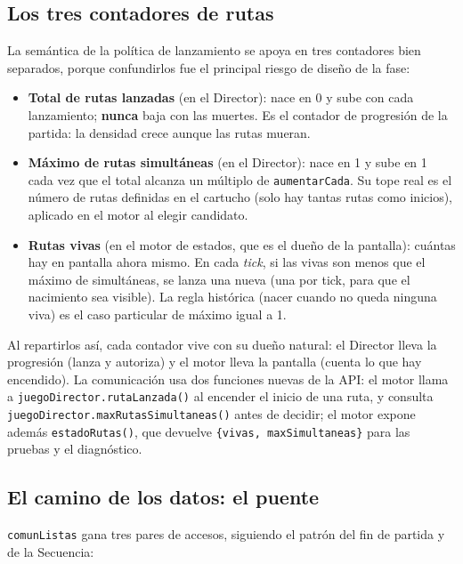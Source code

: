 \subsection{Los tres contadores de rutas}

La semántica de la política de lanzamiento se apoya en tres
contadores bien separados, porque confundirlos fue el principal
riesgo de diseño de la fase:

\begin{itemize}
	\item \textbf{Total de rutas lanzadas} (en el Director): nace en 0 y
	sube con cada lanzamiento; \textbf{nunca} baja con las muertes. Es el
	contador de progresión de la partida: la densidad crece aunque las
	rutas mueran.
	\item \textbf{Máximo de rutas simultáneas} (en el Director): nace en
	1 y sube en 1 cada vez que el total alcanza un múltiplo de
	\texttt{aumentarCada}. Su tope real es el número de rutas definidas
	en el cartucho (solo hay tantas rutas como inicios), aplicado en el
	motor al elegir candidato.
	\item \textbf{Rutas vivas} (en el motor de estados, que es el dueño
	de la pantalla): cuántas hay en pantalla ahora mismo. En cada
	\textit{tick}, si las vivas son menos que el máximo de simultáneas,
	se lanza una nueva (una por tick, para que el nacimiento sea
	visible). La regla histórica (nacer cuando no queda ninguna viva) es
	el caso particular de máximo igual a 1.
\end{itemize}

Al repartirlos así, cada contador vive con su dueño natural: el
Director lleva la progresión (lanza y autoriza) y el motor lleva la
pantalla (cuenta lo que hay encendido). La comunicación usa dos
funciones nuevas de la API: el motor llama a
\texttt{juegoDirector.rutaLanzada()} al encender el inicio de una
ruta, y consulta \texttt{juegoDirector.maxRutasSimultaneas()} antes
de decidir; el motor expone además
\texttt{estadoRutas()}, que devuelve \texttt{\{vivas,
	maxSimultaneas\}} para las pruebas y el diagnóstico.

\subsection{El camino de los datos: el puente}

\texttt{comunListas} gana tres pares de accesos, siguiendo el patrón
del fin de partida y de la Secuencia:
